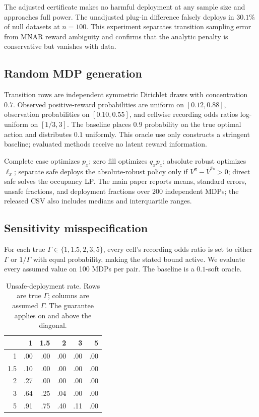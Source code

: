 \documentclass[letterpaper]{article}
\begin{document}
The adjusted certificate makes no harmful deployment at any sample size and approaches full power. The unadjusted plug-in difference falsely deploys in $30.1\%$ of null datasets at $n=100$. This experiment separates transition sampling error from MNAR reward ambiguity and confirms that the analytic penalty is conservative but vanishes with data.

\subsection{Random MDP generation}
Transition rows are independent symmetric Dirichlet draws with concentration $0.7$. Observed positive-reward probabilities are uniform on $[0.12,0.88]$, observation probabilities on $[0.10,0.55]$, and cellwise recording odds ratios log-uniform on $[1/3,3]$. The baseline places $0.9$ probability on the true optimal action and distributes $0.1$ uniformly. This oracle use only constructs a stringent baseline; evaluated methods receive no latent reward information.

Complete case optimizes $p_x$; zero fill optimizes $q_xp_x$; absolute robust optimizes $\ell_x$; separate safe deploys the absolute-robust policy only if $\underline V^\pi-\overline V^{\pi_b}>0$; direct safe solves the occupancy LP. The main paper reports means, standard errors, unsafe fractions, and deployment fractions over 200 independent MDPs; the released CSV also includes medians and interquartile ranges.

\subsection{Sensitivity misspecification}
For each true $\Gamma\in\{1,1.5,2,3,5\}$, every cell's recording odds ratio is set to either $\Gamma$ or $1/\Gamma$ with equal probability, making the stated bound active. We evaluate every assumed value on 100 MDPs per pair. The baseline is a $0.1$-soft oracle.

\begin{table}[t]
\centering
\small
\caption{Unsafe-deployment rate. Rows are true $\Gamma$; columns are assumed $\Gamma$. The guarantee applies on and above the diagonal.}
\label{tab:gamma}
\begin{tabular}{rrrrrr}
\toprule
 & 1 & 1.5 & 2 & 3 & 5 \\
\midrule
1   & .00 & .00 & .00 & .00 & .00 \\
1.5 & .10 & .00 & .00 & .00 & .00 \\
2   & .27 & .00 & .00 & .00 & .00 \\
3   & .64 & .25 & .04 & .00 & .00 \\
5   & .91 & .75 & .40 & .11 & .00 \\
\bottomrule
\end{tabular}
\end{table}
\end{document}
